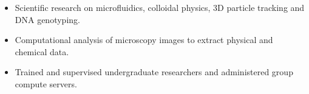 \documentclass[12pt]{article}
\begin{document}
\begin{itemize}\setlength{\itemsep}{0cm}
  \setlength{\parskip}{0cm}

\item Scientific research on microfluidics, colloidal physics, 3D particle tracking and DNA genotyping.

\item Computational analysis of microscopy images to extract physical and chemical data.







\item Trained and supervised undergraduate researchers and administered group compute servers.







\end{itemize}
\end{document}
